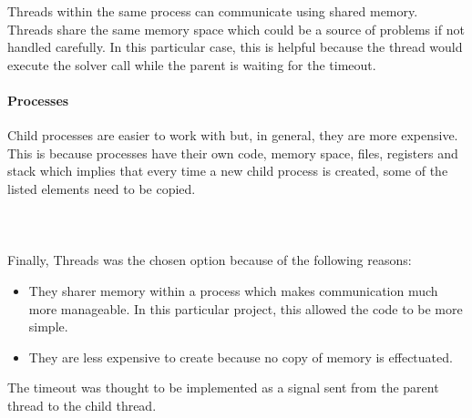 Threads within the same process can communicate using shared memory. \\
Threads share the same memory space which could be a source of problems if not handled carefully. In this particular case, this is helpful because the thread would execute the solver call while the parent is waiting for the timeout.  

\paragraph{Processes}

Child processes are easier to work with but, in general, they are more expensive. This is because processes have their own code, memory space, files, registers and stack which implies that every time a new child process is created, some of the listed elements need to be copied.  \\\\\\\\
Finally, Threads was the chosen option because of the following reasons: 

\begin{itemize}
	\item They sharer memory within a process which makes communication much more manageable. In this particular project, this allowed the code to be more simple. 
	\item They are less expensive to create because no copy of memory is effectuated.
\end{itemize}
The timeout was thought to be implemented as a signal sent from the parent thread to the child thread.  


